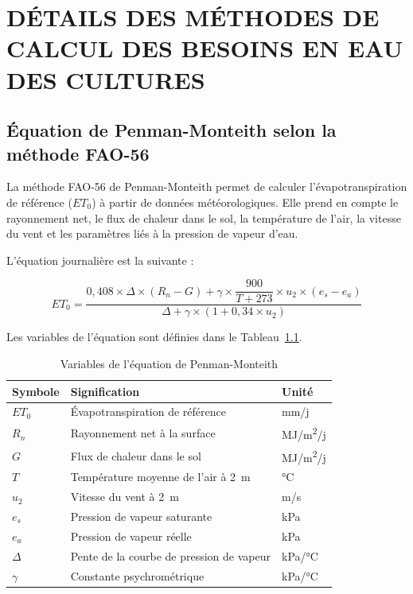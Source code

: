 \chapter{DÉTAILS DES MÉTHODES DE CALCUL DES BESOINS EN EAU DES CULTURES}
\label{ann:calculs}

\section{Équation de Penman-Monteith selon la méthode FAO-56}

La méthode FAO-56 de Penman-Monteith permet de calculer l'évapotranspiration de référence ($ET_0$) à partir de données météorologiques. Elle prend en compte le rayonnement net, le flux de chaleur dans le sol, la température de l'air, la vitesse du vent et les paramètres liés à la pression de vapeur d'eau.

L'équation journalière est la suivante :

\begin{equation}
    ET_0 = \frac{0{,}408 \times \Delta \times (R_n - G) + \gamma \times \dfrac{900}{T + 273} \times u_2 \times (e_s - e_a)}{\Delta + \gamma \times (1 + 0{,}34 \times u_2)}
    \label{eq:ann_penman_monteith}
\end{equation}

Les variables de l'équation sont définies dans le Tableau~\ref{tab:ann_variables_pm}.

\begin{table}[H]
    \centering
    \caption{Variables de l'équation de Penman-Monteith}
    \label{tab:ann_variables_pm}
    \begin{tabular}{|p{2cm}|p{7.5cm}|p{3cm}|}
        \hline
        \textbf{Symbole} & \textbf{Signification} & \textbf{Unité} \\
        \hline
        $ET_0$ & Évapotranspiration de référence & mm/j \\
        \hline
        $R_n$ & Rayonnement net à la surface & MJ/m\textsuperscript{2}/j \\
        \hline
        $G$ & Flux de chaleur dans le sol & MJ/m\textsuperscript{2}/j \\
        \hline
        $T$ & Température moyenne de l'air à 2~m & °C \\
        \hline
        $u_2$ & Vitesse du vent à 2~m & m/s \\
        \hline
        $e_s$ & Pression de vapeur saturante & kPa \\
        \hline
        $e_a$ & Pression de vapeur réelle & kPa \\
        \hline
        $\Delta$ & Pente de la courbe de pression de vapeur & kPa/°C \\
        \hline
        $\gamma$ & Constante psychrométrique & kPa/°C \\
        \hline
    \end{tabular}
\end{table}

